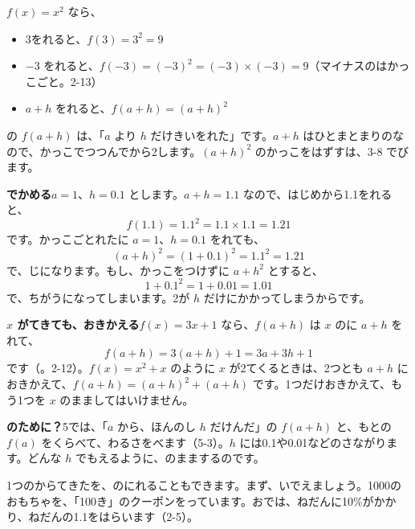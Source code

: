 $f(x)=x^2$ なら、
\begin{itemize}[leftmargin=1.6\zw, itemsep=1pt, topsep=2pt, label={\color{\bkTT}●}]
\item 3をれると、$f(3)=3^2=9$
\item $-3$ をれると、$f(-3)=(-3)^2=(-3)\times(-3)=9$（マイナスのはかっこごと。2-13）
\item $a+h$ をれると、$f(a+h)=(a+h)^2$
\end{itemize}
の $f(a+h)$ は、「$a$ より $h$ だけきいをれた」です。$a+h$ はひとまとまりのなので、かっこでつつんでから2します。$(a+h)^2$ のかっこをはずすは、3-8 でびます。

\textbf{でかめる}\quad $a=1$、$h=0.1$ とします。$a+h=1.1$ なので、はじめから1.1をれると、
\[ f(1.1)=1.1^2=1.1\times1.1=1.21 \]
です。かっこごとれたに $a=1$、$h=0.1$ をれても、
\[ (a+h)^2=(1+0.1)^2=1.1^2=1.21 \]
で、じになります。もし、かっこをつけずに $a+h^2$ とすると、
\[ 1+0.1^2=1+0.01=1.01 \]
で、ちがうになってしまいます。2が $h$ だけにかかってしまうからです。

\textbf{$x$ がてきても、おきかえる}\quad $f(x)=3x+1$ なら、$f(a+h)$ は $x$ のに $a+h$ をれて、
\[ f(a+h)=3(a+h)+1=3a+3h+1 \]
です（。2-12）。$f(x)=x^2+x$ のように $x$ が2てくるときは、2つとも $a+h$ におきかえて、$f(a+h)=(a+h)^2+(a+h)$ です。1つだけおきかえて、もう1つを $x$ のまましてはいけません。

\textbf{のために？}\quad {}5では、「$a$ から、ほんのし $h$ だけんだ」の $f(a+h)$ と、もとの $f(a)$ をくらべて、わるさをべます（5-3）。$h$ には0.1や0.01などのさながります。どんな $h$ でもえるように、のままするのです。


\leavevmode\label{bk:3-3:gousei}1つのからてきたを、のにれることもできます。まず、いでえましょう。1000のおもちゃを、「100き」のクーポンをっています。おでは、ねだんに10\%がかかり、ねだんの1.1をはらいます（2-5）。

